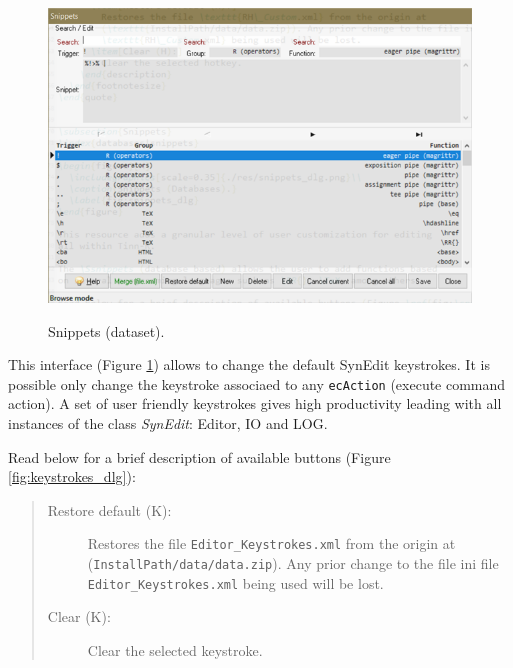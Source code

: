 \begin{figure}[H]
  \includegraphics[scale=0.35]{./res/dlg_snippets.png}\\
  \caption{Snippets (dataset).}
  \label{fig:dlg_snippets}
\end{figure}
This interface
(Figure \ref{fig:dlg_snippets})
allows to change the default SynEdit keystrokes.
It is possible only change the keystroke associaed to any \texttt{ecAction} (execute command action).
A set of user friendly keystrokes gives high productivity leading with
all instances of the class \textit{SynEdit}: Editor, IO and LOG.

Read below for a brief description of available buttons (Figure \ref{fig:keystrokes_dlg}):

\begin{quote}
  \begin{footnotesize}
    \begin{description}
      \item[Restore default (K):]
        Restores the file \texttt{Editor\_Keystrokes.xml} from the origin at
        (\texttt{InstallPath/data/data.zip}). Any prior change to the file ini file
        \texttt{Editor\_Keystrokes.xml} being used will be lost.
      \item[Clear (K):]
        Clear the selected keystroke.
    \end{description}
  \end{footnotesize}
\end{quote}

